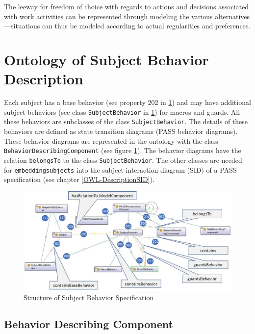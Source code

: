 The leeway for freedom of choice with regards to actions and decisions associated with work activities can be represented through modeling the various alternatives—situations can thus be modeled according to actual regularities and preferences.

\section{Ontology of Subject Behavior Description}

Each subject has a base behavior (see property 202 in \ref{fig:20190104-simple-elements-and-modellelement}) and may have additional subject behaviors (see class \texttt{SubjectBehavior} in \ref{fig:20190104-simple-elements-and-modellelement}) for macros and guards. All these behaviors are subclasses of the class \texttt{SubjectBehavior}. The details of these behaviors are defined as state transition diagrams (PASS behavior diagrams). These behavior diagrams are represented in the ontology with the class \texttt{BehaviorDescribingComponent} (see figure \ref{fig:20190104-simple-elements-and-modellelement}). The behavior diagrams have the relation \texttt{belongsTo} to the class \texttt{SubjectBehavior}. The other classes are needed for \texttt{embeddingsubjects} into the subject interaction diagram (SID) of a PASS specification (see chapter \ref{OWL-DescriptionSID}).

\begin{figure}[htbp]
	\centering
	\includegraphics[width=0.9\linewidth]{Figures/Ontology/SubjectExecution/20190104-SImple-Elements-and-Modellelement}
	\caption[Structure of Subject Behavior Specification]{Structure of Subject Behavior Specification}
	\label{fig:20190104-simple-elements-and-modellelement}
\end{figure}

\subsection{Behavior Describing Component}

